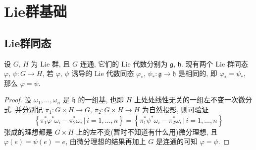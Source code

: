 \chapter{Lie群基础}
\section{Lie群同态}
    \begin{theorem}
        设 $G,\,H$ 为 $\mathrm{Lie}$ 群, 且 $G$ 连通, 它们的 $\mathrm{Lie}$ 代数分别为 $\mathfrak{g,\,h}$. 现有两个 $\mathrm{Lie}$ 群同态 $\varphi,\,\psi:G\rightarrow H$, 
        若 $\varphi,\,\psi$ 诱导的 $\mathrm{Lie}$ 代数同态 $\varphi_*,\,\psi_*:\mathfrak{g}\rightarrow\mathfrak{h}$ 是相同的, 即 $\varphi_*=\psi_*$, 那么 $\varphi=\psi$.
    \end{theorem}
    \begin{proof}
        设 $\omega_1,\dots,\omega_n$ 是 $\mathfrak{h}$ 的一组基, 也即 $H$ 上处处线性无关的一组左不变一次微分式.
        并分别记 $\pi_1:G\times H\rightarrow G$, $\pi_2:G\times H\rightarrow H$ 为自然投影, 则可验证
        \begin{equation*}
            \left\{\pi_1^*\varphi^*\omega_i-\pi_2^*\omega_i\,\Big|\,i=1,\dots,n\right\} = \left\{\pi_1^*\psi^*\omega_i-\pi_2^*\omega_i\,\Big|\,i=1,\dots,n\right\}
        \end{equation*}
        张成的理想都是 $G\times H$ 上的左不变(暂时不知道有什么用)微分理想, 且 $\varphi(e) = \psi(e) = e$, 由微分理想的结果再加上 $G$ 是连通的可知 $\varphi = \psi$.
    \end{proof}
